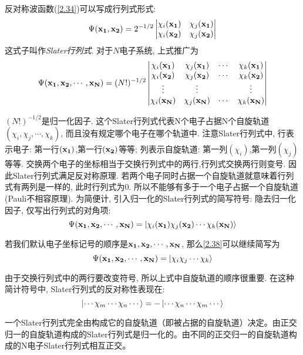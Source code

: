 反对称波函数(\ref{2.34})可以写成行列式形式:
\begin{equation}
\Psi(\mathbf{x_1,x_2})=2^{-1/2}
\begin{vmatrix}
\chi_i(\mathbf{x_1})&\chi_j(\mathbf{x_1})\\
\chi_i(\mathbf{x_2})&\chi_j(\mathbf{x_2})
\end{vmatrix}
\end{equation}
这式子叫作\emph{Slater行列式}. 对于$N$电子系统, 上式推广为
\begin{equation}
\Psi(\mathbf{x_1,x_2,\cdots,x_N})=(N!)^{-1/2}
\begin{vmatrix}
\chi_i(\mathbf{x_1})&\chi_j(\mathbf{x_1})&\cdots&\chi_k(\mathbf{x_1})\\
\chi_i(\mathbf{x_2})&\chi_j(\mathbf{x_2})&\cdots&\chi_k(\mathbf{x_2})\\
\vdots			&\vdots			& \,&\vdots\\
\chi_i(\mathbf{x_N})&\chi_j(\mathbf{x_N})&\cdots&\chi_k(\mathbf{x_N})
\end{vmatrix}
\end{equation}

$(N!)^{-1/2}$是归一化因子. 这个Slater行列式代表N个电子占据N个自旋轨道$(\chi_i,\chi_j,\cdots,\chi_k)$, 而且没有规定哪个电子在哪个轨道中. 注意Slater行列式中, 行表示电子: 第一行$(\mathbf{x_1})$,第一行$(\mathbf{x_2})$等等; 列表示自旋轨道: 第一列$(\chi_i)$,第一列$(\chi_j)$等等. 交换两个电子的坐标相当于交换行列式中的两行,行列式交换两行则变号. 因此Slater行列式满足反对称原理. 若两个电子同时占据一个自旋轨道就意味着行列式有两列是一样的, 此时行列式为$0$. 所以不能够有多于一个电子占据一个自旋轨道(Pauli不相容原理). 为简便计, 引入归一化的Slater行列式的简写符号: 隐去归一化因子, 仅写出行列式的对角项:
\begin{equation}
\label{2.38}
\Psi(\mathbf{x_1,x_2,\cdots,x_N})=\Ket{\chi_i(\mathbf{x_1})\chi_j(\mathbf{x_2})\cdots\chi_k(\mathbf{x_N})}
\end{equation}

若我们默认电子坐标记号的顺序是$\mathbf{x_1,x_2,\cdots,x_N}$, 那么\ref{2.38}可以继续简写为
\begin{equation}
\Psi(\mathbf{x_1,x_2,\cdots,x_N})=\Ket{\chi_i\chi_j\cdots\chi_k}
\end{equation}

由于交换行列式中的两行要改变符号, 所以上式中自旋轨道的顺序很重要. 在这种简计符号中, Slater行列式的反对称性表现在:
\begin{equation}
\Ket{\cdots\chi_m\cdots\chi_n\cdots}=-\Ket{\cdots\chi_n\cdots\chi_m\cdots}
\end{equation}

一个Slater行列式完全由构成它的自旋轨道（即被占据的自旋轨道）决定。由正交归一的自旋轨道构成的Slater行列式是归一化的。由不同的正交归一的自旋轨道构成的N电子Slater行列式相互正交。

